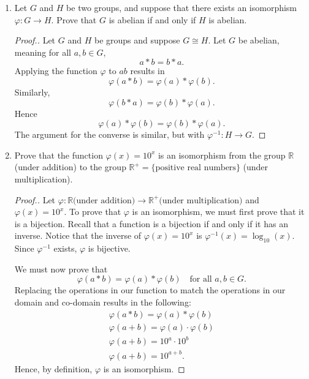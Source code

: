 \documentclass[11pt,twoside]{article}
\begin{document}
\begin{enumerate}
\vspace{0.5cm}

\item Let $G$ and $H$ be two groups, and suppose that there exists an isomorphism $\varphi: G \rightarrow H$.  Prove that $G$ is abelian if and only if $H$ is abelian.

\begin{proof}[\color{red}Proof.]Let $G$ and $H$ be groups and suppose $G \cong H$.  Let $G$ be abelian, meaning for all $a,b \in G$,
\[ a \ast b = b \ast a. \]
Applying the function $\varphi$ to $ab$ results in
\[ \varphi(a \ast b) = \varphi(a) \ast \varphi(b). \]
Similarly,
\[ \varphi(b \ast a) = \varphi(b) \ast \varphi(a). \]
Hence
\[ \varphi(a) \ast \varphi(b) = \varphi(b) \ast \varphi(a). \]
The argument for the converse is similar, but with $\varphi^{-1}: H \rightarrow G$.
\end{proof}

\vspace{0.5cm}

\item Prove that the function $\varphi(x) = 10^x$ is an isomorphism from the group $\mathbb{R}$ (under addition) to the group $\mathbb{R}^+ = \{\text{positive real numbers}\}$ (under multiplication).

\begin{proof}[\color{red}Proof.]Let $\varphi: \mathbb{R} \text{(under addition)} \to \mathbb{R}^+ \text{(under multiplication)}$ and $\varphi(x) = 10^x$.  To prove that $\varphi$ is an isomorphism, we must first prove that it is a bijection.  Recall that a function is a bijection if and only if it has an inverse.  Notice that the inverse of $\varphi(x) = 10^x$ is $\varphi^{-1}(x) = \log_{10}(x)$.  Since $\varphi^{-1}$ exists, $\varphi$ is bijective.

We must now prove that
\[ \varphi(a \ast b) = \varphi(a) \ast \varphi(b) \quad \text{for all }a,b\in G. \]
Replacing the operations in our function to match the operations in our domain and co-domain results in the following:
\begin{align*}
\varphi(a \ast b) = \varphi(a) \ast \varphi(b)\\
\varphi(a + b) = \varphi(a) \cdot \varphi(b)\\
\varphi(a + b) = 10^a \cdot 10^b\\
\varphi(a + b) = 10^{a+b}.
\end{align*}
Hence, by definition, $\varphi$ is an isomorphism.
\end{proof}


\end{enumerate}
\end{document}
